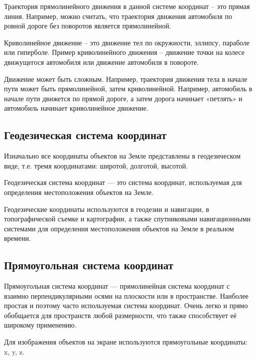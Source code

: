 \documentclass[14pt, a4paper]{extarticle}
\begin{document}
	Траектория прямолинейного движения в данной системе координат – это прямая линия. Например, можно считать, что траектория движения автомобиля по ровной дороге без поворотов является прямолинейной.\par
	
	Криволинейное движение – это движение тел по окружности, эллипсу, параболе или гиперболе. Пример криволинейного движения – движение точки на колесе движущегося автомобиля или движение автомобиля в повороте.\par
	
	Движение может быть сложным. Например, траектория движения тела в начале пути может быть прямолинейной, затем криволинейной. Например, автомобиль в начале пути движется по прямой дороге, а затем дорога начинает «петлять» и автомобиль начинает криволинейное движение.\par
	
	
		
	\subsection{Геодезическая система координат}
	
	Изначально все координаты объектов на Земле представлены в геодезическом виде, т.е. тремя координатами:
	широтой, долготой, высотой.\par 
	Геодезическая система координат — это система координат, используемая для определения местоположения объектов на Земле.\par
	
	Геодезические координаты используются в геодезии и навигации, в топографической съемке и картографии, а также спутниковыми навигационными системами для определения местоположения объектов на Земле в реальном времени.\par
			
	\subsection{Прямоугольная система координат}
	Прямоугольная система координат — прямолинейная система координат с взаимно перпендикулярными осями на плоскости или в пространстве. Наиболее простая и поэтому часто используемая система координат. Очень легко и прямо обобщается для пространств любой размерности, что также способствует её широкому применению.
	
	Для изображения объектов на экране используются прямоугольные координаты: x, y, z.
	
\end{document}

